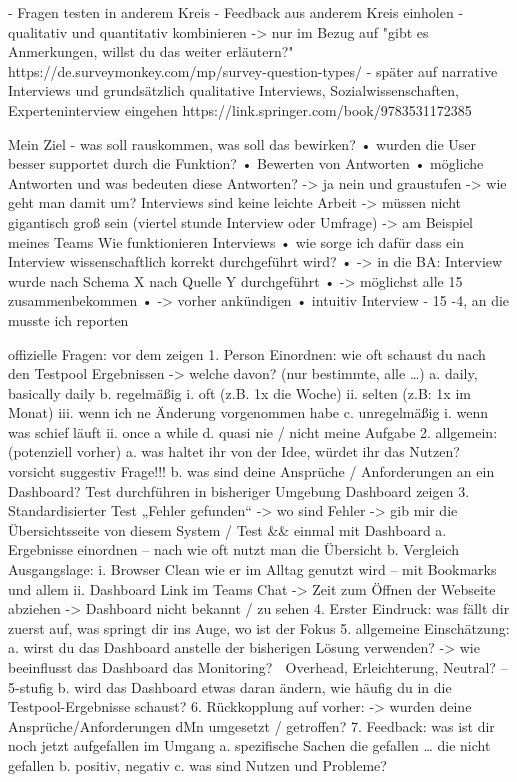 
- Fragen testen in anderem Kreis
- Feedback aus anderem Kreis einholen
- qualitativ und quantitativ kombinieren
-> nur im Bezug auf "gibt es Anmerkungen, willst du das weiter erläutern?"
https://de.surveymonkey.com/mp/survey-question-types/
- später auf narrative Interviews und grundsätzlich qualitative Interviews, Sozialwissenschaften, Experteninterview eingehen
https://link.springer.com/book/9783531172385


Mein Ziel - was soll rauskommen, was soll das bewirken?
•	wurden die User besser supportet durch die Funktion?
•	
Bewerten von Antworten
•	mögliche Antworten und was bedeuten diese Antworten?
-> ja nein und graustufen
-> wie geht man damit um?
Interviews sind keine leichte Arbeit
-> müssen nicht gigantisch groß sein (viertel stunde Interview oder Umfrage)
-> am Beispiel meines Teams
Wie funktionieren Interviews
•	wie sorge ich dafür dass ein Interview wissenschaftlich korrekt durchgeführt wird?
•	-> in die BA: Interview wurde nach Schema X nach Quelle Y durchgeführt
•	-> möglichst alle 15 zusammenbekommen
•	-> vorher ankündigen
•	intuitiv Interview
- 15 -4, an die musste ich reporten

offizielle Fragen:
vor dem zeigen
1.	Person Einordnen: wie oft schaust du nach den Testpool Ergebnissen
-> welche davon? (nur bestimmte, alle …)
a.	daily, basically daily
b.	regelmäßig
i.	oft (z.B. 1x die Woche)
ii.	selten (z.B: 1x im Monat)
iii.	wenn ich ne Änderung vorgenommen habe
c.	unregelmäßig
i.	wenn was schief läuft
ii.	once a while
d.	quasi nie / nicht meine Aufgabe
2.	allgemein: (potenziell vorher)
a.	was haltet ihr von der Idee, würdet ihr das Nutzen?
 vorsicht suggestiv Frage!!!
b.	was sind deine Ansprüche / Anforderungen an ein Dashboard?
Test durchführen in bisheriger Umgebung
Dashboard zeigen
3.	Standardisierter Test „Fehler gefunden“
-> wo sind Fehler
-> gib mir die Übersichtsseite von diesem System / Test && einmal mit Dashboard
a.	Ergebnisse einordnen – nach wie oft nutzt man die Übersicht
b.	Vergleich Ausgangslage:
i.	Browser Clean wie er im Alltag genutzt wird – mit Bookmarks und allem
ii.	Dashboard Link im Teams Chat
-> Zeit zum Öffnen der Webseite abziehen
-> Dashboard nicht bekannt / zu sehen
4.	Erster Eindruck: was fällt dir zuerst auf, was springt dir ins Auge, wo ist der Fokus
5.	allgemeine Einschätzung:
a.	wirst du das Dashboard anstelle der bisherigen Lösung verwenden?
-> wie beeinflusst das Dashboard das Monitoring?
 Overhead, Erleichterung, Neutral? – 5-stufig
b.	wird das Dashboard etwas daran ändern, wie häufig du in die Testpool-Ergebnisse schaust?
6.	Rückkopplung auf vorher: 
-> wurden deine Ansprüche/Anforderungen dMn umgesetzt / getroffen?
7.	Feedback: was ist dir noch jetzt aufgefallen im Umgang
a.	spezifische Sachen die gefallen … die nicht gefallen
b.	positiv, negativ
c.	was sind Nutzen und Probleme?

